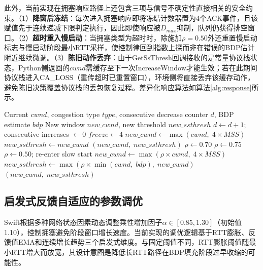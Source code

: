\documentclass[10pt,twocolumn]{article}
\begin{document}
此外，当前实现在拥塞响应路径上还包含三项与信号不确定性直接相关的安全约束。（1）\textbf{降窗后冻结}：每次进入拥塞响应即将冻结计数器置为4个ACK事件，且该赋值先于连续递减下限判定执行，因此即使响应被$D_{max}$抑制，队列仍获得排空窗口。（2）\textbf{超时重入慢启动}：当拥塞类型为超时时，除施加$\rho=0.50$外还重置慢启动标志与慢启动阶段最小RTT采样，使控制律回到指数上探而非在错误的BDP估计附近继续微调。（3）\textbf{陈旧动作丢弃}：由于GetSsThresh回调接收的是常量协议栈状态，Python侧返回的$cwnd$需缓存至下一次IncreaseWindow才能生效；若在此期间协议栈进入CA\_LOSS（重传超时已重置窗口），环境侧将直接丢弃该缓存动作，避免陈旧决策覆盖协议栈的丢包恢复过程。差异化响应算法如算法\ref{alg:response}所示。

\begin{algorithm}[htbp]
\caption{Differentiated Congestion Response}
\label{alg:response}
\small
\begin{algorithmic}[1]
\REQUIRE Current $cwnd$, congestion type $type$, consecutive decrease counter $d$, BDP estimate $bdp$
\ENSURE New window $new\_cwnd$, new threshold $new\_ssthresh$
\STATE $d \leftarrow d + 1$; \; consecutive increases $\leftarrow 0$
\STATE $freeze \leftarrow 4$ 
    \STATE $new\_cwnd \leftarrow \max(cwnd, \; 4 \times MSS)$ 
    \STATE $new\_ssthresh \leftarrow new\_cwnd$
    \RETURN $(new\_cwnd, \; new\_ssthresh)$
\ENDIF
{}
    \STATE $\rho \leftarrow 0.70$
    \STATE $\rho \leftarrow 0.75$
    \STATE $\rho \leftarrow 0.50$; \; re-enter slow start
\ENDIF
\STATE $new\_cwnd \leftarrow \max(\rho \times cwnd, \; 4 \times MSS)$
\STATE $new\_ssthresh \leftarrow \max(\rho \times \min(cwnd, \; bdp), \; new\_cwnd)$
\RETURN $(new\_cwnd, \; new\_ssthresh)$
\end{algorithmic}
\end{algorithm}

\subsection{启发式反馈自适应的参数调优}
\label{subsubsec:alpha}

Swift根据多种网络状态因素动态调整乘性增加因子$\alpha \in [0.85, 1.30]$（初始值1.10），控制拥塞避免阶段窗口增长速度。当前实现的调优逻辑基于RTT膨胀、反馈值EMA和连续增长趋势三个启发式维度。与固定阈值不同，RTT膨胀阈值随最小RTT增大而放宽，其设计意图是降低长RTT路径在BDP填充阶段过早收缩的可能性。
\end{document}
